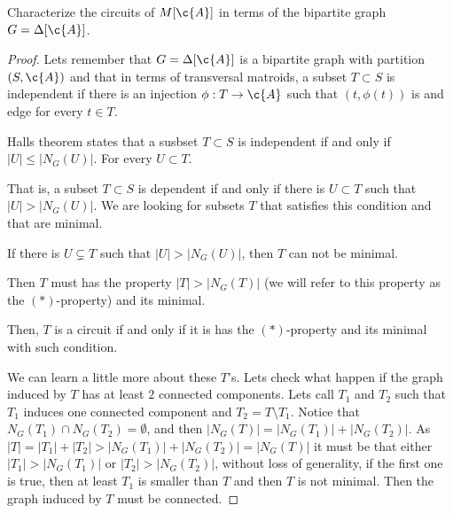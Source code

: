 \prob
{
    Characterize the circuits of $M[\c{A}]$ in terms of the bipartite graph $G = \Delta[\c{A}]$.
}
\begin{proof}
    Lets remember that $G = \Delta[\c{A}]$ is a bipartite graph with partition $(S, \c{A})$ and that
    in terms of transversal matroids, a subset $T \subset S$ is independent if there is an injection
    $\phi : T \rightarrow \c{A}$ such that $(t, \phi(t))$ is and edge for every $t \in T$.\pn
    
    Halls theorem states that a susbset $T \subset S$ is independent if and only if $|U| \leq |N_G(U)|$.
    For every $U \subset T$.\pn
    
    That is, a subset $T \subset S$ is dependent if and only if there is $U \subset T$ such that $|U| > |N_G(U)|$. 
    We are looking for subsets $T$ that satisfies this condition and that are minimal.\pn
    
    If there is $U \subsetneq T$ such that  $|U| > |N_G(U)|$, then $T$ can not be minimal.
    
    Then $T$ must has the property $|T| > |N_G(T)|$ (we will refer to this property as the
    $(*)$-property) and its minimal.\pn

    Then, $T$ is a circuit if and only if it is has the $(*)$-property and its minimal with such condition.
    
    We can learn a little more about these $T$'s. Lets check what happen if the graph induced by $T$ has at least 
    $2$ connected components. Lets call $T_1$ and $T_2$ such that $T_1$ induces one connected component and $T_2 = T \setminus T_1$.
    Notice that $N_G(T_1) \cap N_G(T_2) = \emptyset$, and then $|N_G(T)| = |N_G(T_1)| + |N_G(T_2)|$. 
    As $|T| = |T_1| + |T_2| > |N_G(T_1) | + |N_G(T_2)| = |N_G(T)|$ 
    it must be that either $|T_1| > |N_G(T_1)|$ or $|T_2| > |N_G(T_2)|$, without loss of generality, 
    if the first one is true, then at least $T_1$ is smaller than $T$ and then $T$ is not minimal. 
    Then the graph induced by $T$ must     be connected.\pn
     

\end{proof}
